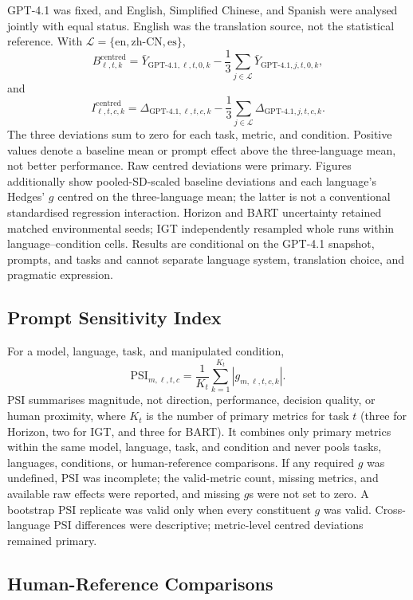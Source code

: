 \documentclass[logo,msc,inf]{infthesis}       %
\begin{document}
GPT-4.1 was fixed, and English, Simplified Chinese, and Spanish were analysed jointly with equal status. English was the translation source, not the statistical reference. With $\mathcal L=\{\mathrm{en},\mathrm{zh\mbox{-}CN},\mathrm{es}\}$,
\[
B^{\mathrm{centred}}_{\ell,t,k}=\bar Y_{\mathrm{GPT\mbox{-}4.1},\ell,t,0,k}-\frac13\sum_{j\in\mathcal L}\bar Y_{\mathrm{GPT\mbox{-}4.1},j,t,0,k},
\]
and
\[
I^{\mathrm{centred}}_{\ell,t,c,k}=\Delta_{\mathrm{GPT\mbox{-}4.1},\ell,t,c,k}-\frac13\sum_{j\in\mathcal L}\Delta_{\mathrm{GPT\mbox{-}4.1},j,t,c,k}.
\]
The three deviations sum to zero for each task, metric, and condition. Positive values denote a baseline mean or prompt effect above the three-language mean, not better performance. Raw centred deviations were primary. Figures additionally show pooled-SD-scaled baseline deviations and each language's Hedges' $g$ centred on the three-language mean; the latter is not a conventional standardised regression interaction. Horizon and BART uncertainty retained matched environmental seeds; IGT independently resampled whole runs within language--condition cells. Results are conditional on the GPT-4.1 snapshot, prompts, and tasks and cannot separate language system, translation choice, and pragmatic expression.

\subsection{Prompt Sensitivity Index}

For a model, language, task, and manipulated condition,
\[
\mathrm{PSI}_{m,\ell,t,c}=\frac{1}{K_t}\sum_{k=1}^{K_t}|g_{m,\ell,t,c,k}|.
\]
PSI summarises magnitude, not direction, performance, decision quality, or human proximity, where $K_t$ is the number of primary metrics for task $t$ (three for Horizon, two for IGT, and three for BART). It combines only primary metrics within the same model, language, task, and condition and never pools tasks, languages, conditions, or human-reference comparisons. If any required $g$ was undefined, PSI was incomplete; the valid-metric count, missing metrics, and available raw effects were reported, and missing $g$s were not set to zero. A bootstrap PSI replicate was valid only when every constituent $g$ was valid. Cross-language PSI differences were descriptive; metric-level centred deviations remained primary.

\subsection{Human-Reference Comparisons}
\end{document}
